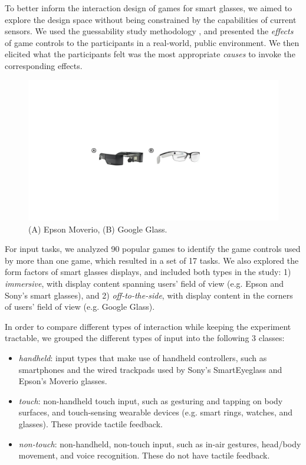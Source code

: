 \documentclass{sigchi}
\begin{document}
To better inform the interaction design of games for smart glasses, we aimed to explore the design space without being constrained by the capabilities of current sensors. We used the guessability study methodology \cite{Wobbrock:2005:MGS:1056808.1057043}, and presented the \emph{effects} of game controls to the participants in a real-world, public environment. We then elicited what the participants felt was the most appropriate \emph{causes} to invoke the corresponding effects. 

    \begin{figure}[!b]
  \centering
  \includegraphics[width=1\columnwidth]{Glasses.pdf}
  \caption{(A) Epson Moverio, (B) Google Glass.}
  \label{fig:Glasses}
  \end{figure}

For input tasks, we analyzed 90 popular games to identify the game controls used by more than one game, which resulted in a set of 17 tasks. We also explored the form factors of smart glasses displays, and included both types in the study: 1) \emph{immersive}, with display content spanning users' field of view (e.g. Epson and Sony's smart glasses), and 2) \emph{off-to-the-side}, with display content in the corners of users' field of view (e.g. Google Glass).

In order to compare different types of interaction while keeping the experiment tractable, we grouped the different types of input into the following 3 classes:
\begin{itemize}
  \item \emph{handheld}: input types that make use of handheld controllers, such as smartphones and the wired trackpads used by Sony's SmartEyeglass and Epson's Moverio glasses.
  \item \emph{touch}: non-handheld touch input, such as gesturing and tapping on body surfaces, and touch-sensing wearable devices (e.g. smart rings, watches, and glasses). These provide tactile feedback.
  \item \emph{non-touch}: non-handheld, non-touch input, such as in-air gestures, head/body movement, and voice recognition. These do not have tactile feedback.
\end{itemize}
 
\end{document}

